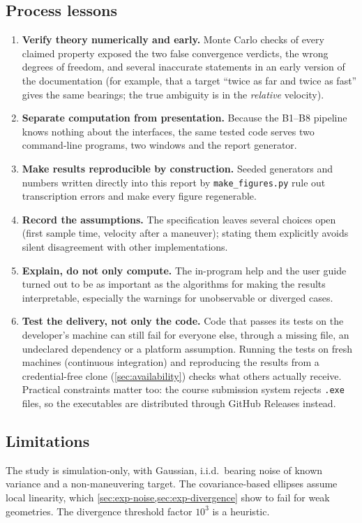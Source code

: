 \documentclass[11pt,a4paper]{article}
\theoremstyle{plain}
\theoremstyle{remark}
\begin{document}
\subsection{Process lessons}
\begin{enumerate}[leftmargin=*]
\item \textbf{Verify theory numerically and early.} Monte Carlo checks of
  every claimed property exposed the two false convergence verdicts, the
  wrong degrees of freedom, and several inaccurate statements in an early
  version of the documentation (for example, that a target ``twice as far
  and twice as fast'' gives the same bearings; the true ambiguity is in the
  \emph{relative} velocity).
\item \textbf{Separate computation from presentation.} Because the B1--B8
  pipeline knows nothing about the interfaces, the same tested code serves
  two command-line programs, two windows and the report generator.
\item \textbf{Make results reproducible by construction.} Seeded generators
  and numbers written directly into this report by \texttt{make\_figures.py}
  rule out transcription errors and make every figure regenerable.
\item \textbf{Record the assumptions.} The specification leaves several
  choices open (first sample time, velocity after a maneuver); stating them
  explicitly avoids silent disagreement with other implementations.
\item \textbf{Explain, do not only compute.} The in-program help and the
  user guide turned out to be as important as the algorithms for making the
  results interpretable, especially the warnings for unobservable or
  diverged cases.
\item \textbf{Test the delivery, not only the code.} Code that passes its
  tests on the developer's machine can still fail for everyone else, through
  a missing file, an undeclared dependency or a platform assumption. Running
  the tests on fresh machines (continuous integration) and reproducing the
  results from a credential-free clone (\cref{sec:availability}) checks what
  others actually receive. Practical constraints matter too: the course
  submission system rejects \texttt{.exe} files, so the executables are
  distributed through GitHub Releases instead.
\end{enumerate}

\subsection{Limitations}
The study is simulation-only, with Gaussian, i.i.d.\ bearing noise of known
variance and a non-maneuvering target. The covariance-based ellipses assume
local linearity, which \cref{sec:exp-noise,sec:exp-divergence} show to fail
for weak geometries. The divergence threshold factor $10^3$ is a heuristic.
\end{document}
